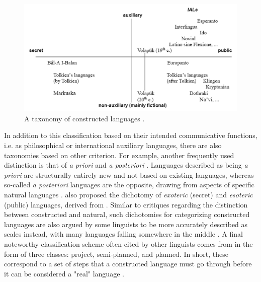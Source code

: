\documentclass[12pt,a4paper]{article}
\numberwithin{figure}{section}
\numberwithin{table}{section}
\numberwithin{definition}{section}
\begin{document}

\begin{figure}[!h]
  \centering
        \includegraphics[width=\textwidth]{./Other/TaxonomyOfPlannedLanguages.png}
        \caption{A taxonomy of constructed languages \parencite{Gobbo2016article}.}
        \label{fig:taxonomyplannedlanguages}
\end{figure}

In addition to this classification based on their intended communicative functions, i.e. as philosophical or international auxiliary languages, there are also taxonomies based on other criterion. For example, another frequently used distinction is that of \textit{a priori} and \textit{a posteriori} \parencite{Schreyer2021article,Gobbo2008article,Schubert1989inbook,Schubert2001book,Novikov2022article,Adelman2014article,Tonkin2015article}. Languages described as being \textit{a priori} are structurally entirely new \parencite{Tonkin2015article} and not based on existing languages, whereas so-called \textit{a posteriori} languages are the opposite, drawing from aspects of specific natural languages \parencite{Schreyer2021article}. \textcite{Gobbo2008article} also proposed the dichotomy of \textit{exoteric} (secret) and \textit{esoteric} (public) languages, derived from \textcite{Bausani1974book}. Similar to critiques regarding the distinction between constructed and natural, such dichotomies for categorizing constructed languages are also argued by some linguists to be more accurately described as scales instead, with many languages falling somewhere in the middle \parencite{Novikov2022article}. A final noteworthy classification scheme often cited by other linguists comes from \textcite{Blanke1989book} in the form of three classes: project, semi-planned, and planned. In short, these correspond to a set of steps that a constructed language must go through before it can be considered a "real" language \parencite{Schubert2001book}. 
\end{document}
